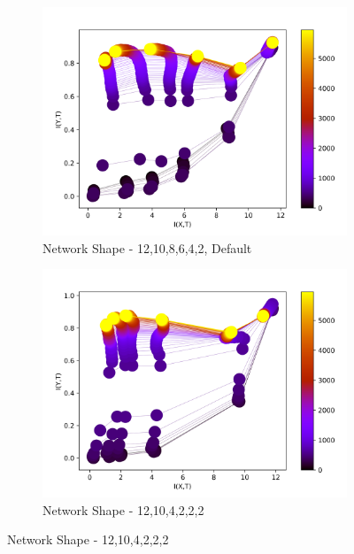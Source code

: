 \documentclass[dissertation.tex]{subfiles}
\begin{document}
\begin{figure}[ht]
  \centering
  \begin{subfigure}[t]{0.32\textwidth}
    \centering
    \includegraphics[width=\textwidth]{figs/eval/networkShape/KDE10,8,6,4.png}
    \caption{
      Network Shape - 12,10,8,6,4,2, Default
    }
    \label{figNetworkShape2}
  \end{subfigure}
  \hfill
  \begin{subfigure}[t]{0.32\textwidth}
    \centering
    \includegraphics[width=\textwidth]{figs/eval/networkShape/KDE10,4,2,2.png}
    \caption{
      Network Shape - 12,10,4,2,2,2
    }
    \label{figNetworkShapeDefault}
  \end{subfigure}
  \hfill

\end{figure}
\end{document}
